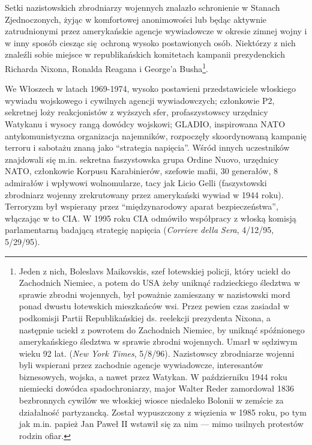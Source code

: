 \documentclass[12pt]{book}
\begin{document}
Setki nazistowskich zbrodniarzy wojennych znalazło schronienie w Stanach Zjednoczonych, żyjąc w komfortowej anonimowości lub będąc aktywnie zatrudnionymi przez amerykańskie agencje wywiadowcze w okresie zimnej wojny i w inny sposób ciesząc się ochroną wysoko postawionych osób. Niektórzy z nich znaleźli sobie miejsce w republikańskich komitetach kampanii prezydenckich Richarda Nixona, Ronalda Reagana i George'a Busha\footnote{Jeden z nich, Boleslavs Maikovskis, szef łotewskiej policji, który uciekł do Zachodnich Niemiec, a potem do USA żeby uniknąć radzieckiego śledztwa w sprawie zbrodni wojennych, był poważnie zamieszany w nazistowski mord ponad dwustu łotewskich mieszkańców wsi. Przez pewien czas zasiadał w podkomisji Partii Republikańskiej ds. reelekcji prezydenta Nixona, a następnie uciekł z powrotem do Zachodnich Niemiec, by uniknąć spóźnionego amerykańskiego śledztwa w sprawie zbrodni wojennych. Umarł w sędziwym wieku 92 lat. (\textit{New York Times}, 5/8/96). Nazistowscy zbrodniarze wojenni byli wspierani przez zachodnie agencje wywiadowcze, interesantów biznesowych, wojska, a nawet przez Watykan. W październiku 1944 roku niemiecki dowódca spadochroniarzy, major Walter Reder zamordował 1836 bezbronnych cywilów we włoskiej wiosce niedaleko Bolonii w zemście za działalność partyzancką. Został wypuszczony z więzienia w 1985 roku, po tym jak m.in. papież Jan Paweł II wstawił się za nim — mimo usilnych protestów rodzin ofiar.}.

We Włoszech w latach 1969-1974, wysoko postawieni przedstawiciele włoskiego wywiadu wojskowego i cywilnych agencji wywiadowczych; członkowie P2, sekretnej loży reakcjonistów z wyższych sfer, profaszystowscy urzędnicy Watykanu i wysocy rangą dowódcy wojskowi; GLADIO, inspirowana NATO antykomunistyczna organizacja najemników, rozpoczęły skoordynowaną kampanię terroru i sabotażu znaną jako
``strategia napięcia''. Wśród innych uczestników znajdowali się m.in. sekretna faszystowska grupa Ordine Nuovo, urzędnicy NATO, członkowie Korpusu Karabinierów, szefowie mafii, 30 generałów, 8 admirałów i wpływowi wolnomularze, tacy jak Licio Gelli (faszystowski zbrodniarz wojenny zrekrutowany przez amerykański wywiad w 1944 roku). Terroryzm był wspierany przez ``międzynarodowy aparat bezpieczeństwa'', włączając w to CIA. W 1995 roku CIA odmówiło współpracy z włoską komisją parlamentarną badającą strategię napięcia (\textit{Corriere della Sera}, 4/12/95, 5/29/95).
\end{document}
